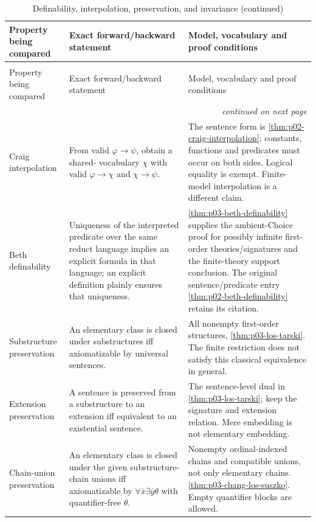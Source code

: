 \begin{longtable}{@{}p{}p{}p{}@{}}
\caption{Definability, interpolation, preservation, and invariance}\\
\toprule
Property being compared & Exact forward/backward statement & Model, vocabulary and proof conditions \\
\midrule
\endfirsthead
\caption[]{Definability, interpolation, preservation, and invariance (continued)}\\
\toprule
Property being compared & Exact forward/backward statement & Model, vocabulary and proof conditions \\
\midrule
\endhead
\midrule\multicolumn{3}{r}{\emph{continued on next page}}\\
\endfoot
\endlastfoot
Craig interpolation & From valid \(\varphi\to\psi\), obtain a shared-
vocabulary \(\chi\) with valid \(\varphi\to\chi\) and
\(\chi\to\psi\). & The sentence form is
\cref{thm:p02-craig-interpolation}; constants, functions and predicates
must occur on both sides. Logical equality is exempt. Finite-model
interpolation is a different claim. \\
Beth definability & Uniqueness of the interpreted predicate over the same
reduct language implies an explicit formula in that language; an explicit
definition plainly ensures that uniqueness. &
\cref{thm:p03-beth-definability} supplies the ambient-Choice proof for
possibly infinite first-order theories/signatures and the finite-theory
support conclusion. The original sentence/predicate entry
\cref{thm:p02-beth-definability} retains its citation. \\
Substructure preservation & An elementary class is closed under
substructures iff axiomatizable by universal sentences. & All nonempty
first-order structures, \cref{thm:p03-los-tarski}. The finite restriction
does not satisfy this classical equivalence in general. \\
Extension preservation & A sentence is preserved from a substructure
to an extension iff equivalent to an existential sentence. & The
sentence-level dual in \cref{thm:p03-los-tarski}; keep the signature
and extension relation. Mere embedding is not elementary embedding. \\
Chain-union preservation & An elementary class is closed under the given
substructure-chain unions iff axiomatizable by
\(\forall\bar x\exists\bar y\theta\) with quantifier-free \(\theta\). &
Nonempty ordinal-indexed chains and compatible unions, not only elementary
chains. \cref{thm:p03-chang-los-suszko}. Empty quantifier blocks are allowed. \\

\end{longtable}
